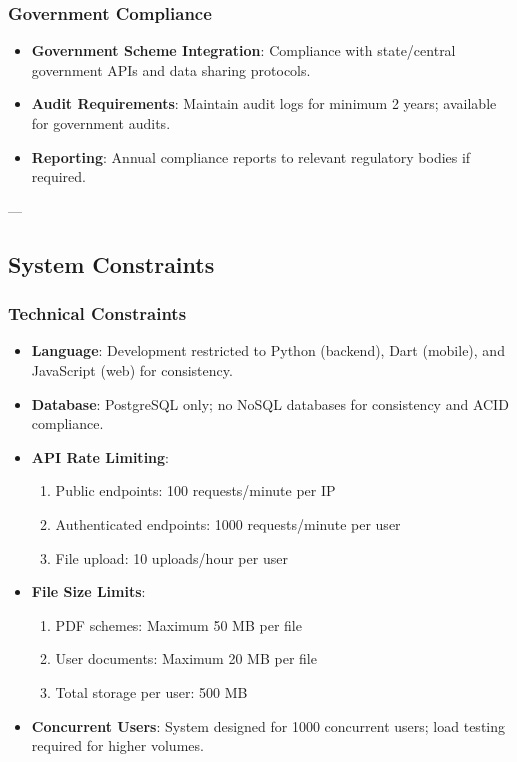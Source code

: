 \subsubsection{Government Compliance}
\begin{itemize}
    \item \textbf{Government Scheme Integration}: Compliance with state/central government APIs and data sharing protocols.
    \item \textbf{Audit Requirements}: Maintain audit logs for minimum 2 years; available for government audits.
    \item \textbf{Reporting}: Annual compliance reports to relevant regulatory bodies if required.
\end{itemize}

---

\subsection{System Constraints}

\subsubsection{Technical Constraints}
\begin{itemize}
    \item \textbf{Language}: Development restricted to Python (backend), Dart (mobile), and JavaScript (web) for consistency.
    \item \textbf{Database}: PostgreSQL only; no NoSQL databases for consistency and ACID compliance.
    \item \textbf{API Rate Limiting}: 
    \begin{enumerate}
        \item Public endpoints: 100 requests/minute per IP
        \item Authenticated endpoints: 1000 requests/minute per user
        \item File upload: 10 uploads/hour per user
    \end{enumerate}
    \item \textbf{File Size Limits}:
    \begin{enumerate}
        \item PDF schemes: Maximum 50 MB per file
        \item User documents: Maximum 20 MB per file
        \item Total storage per user: 500 MB
    \end{enumerate}
    \item \textbf{Concurrent Users}: System designed for 1000 concurrent users; load testing required for higher volumes.
\end{itemize}

